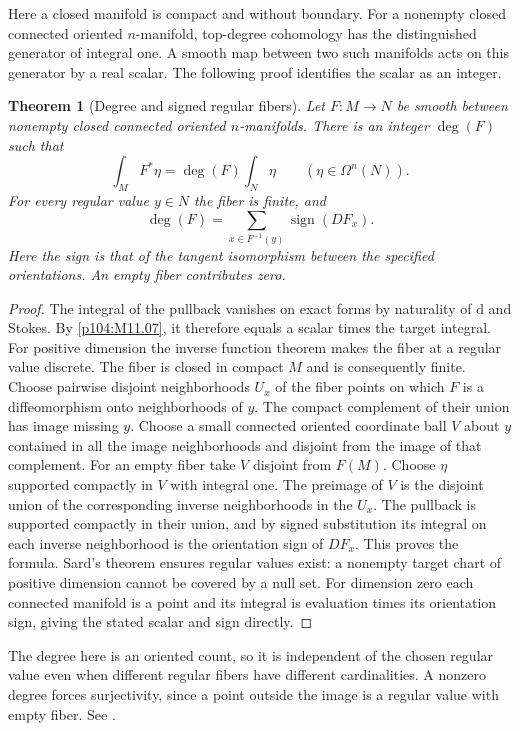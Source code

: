 \documentclass[11pt,oneside,openany]{book}
\newtheorem{theorem}{Theorem}[chapter]
\theoremstyle{definition}
\theoremstyle{remark}
\newcommand{\dd}{\mathrm d}
\begin{document}
Here a closed manifold is compact and without boundary. For a
nonempty closed connected oriented \(n\)-manifold, top-degree
cohomology has the distinguished generator of integral one. A
smooth map between two such manifolds acts on this generator
by a real scalar. The following proof identifies the scalar
as an integer.

\begin{theorem}[Degree and signed regular fibers]
\label{p104:M12.01}
Let \(F:M\to N\) be smooth between nonempty closed connected
oriented \(n\)-manifolds. There is an integer \(\deg(F)\) such that
\[
                 \int_M F^*\eta=\deg(F)\int_N\eta
                   \qquad(\eta\in\Omega^n(N)).
\]
For every regular value \(y\in N\) the fiber is finite, and
\[
       \deg(F)=\sum_{x\in F^{-1}(y)}
                     \operatorname{sign}(D F_x).
\]
Here the sign is that of the tangent isomorphism between the
specified orientations. An empty fiber contributes zero.
\end{theorem}
\begin{proof}
The integral of the pullback vanishes on exact forms by
naturality of \(\dd\) and Stokes. By \cref{p104:M11.07}, it
therefore equals a scalar times the target integral.
For positive dimension the inverse function theorem
makes the fiber at a regular value discrete. The fiber is
closed in compact \(M\) and is consequently finite. Choose
pairwise disjoint neighborhoods \(U_x\) of the fiber points
on which \(F\) is a diffeomorphism onto neighborhoods of \(y\).
The compact complement of their union has image missing
\(y\). Choose a small connected oriented coordinate ball
\(V\) about \(y\) contained in all the image neighborhoods
and disjoint from the image of that complement. For an empty
fiber take \(V\) disjoint from \(F(M)\). Choose \(\eta\) supported
compactly in \(V\) with integral one. The preimage of \(V\)
is the disjoint union of the corresponding inverse
neighborhoods in the \(U_x\). The pullback is supported
compactly in their union, and by signed substitution its
integral on each inverse neighborhood is the orientation
sign of \(D F_x\). This proves the formula. Sard's theorem
ensures regular values exist: a nonempty target chart of
positive dimension cannot be covered by a null set. For
dimension zero each connected manifold is a point and
its integral is evaluation times its orientation sign,
giving the stated scalar and sign directly.
\end{proof}
The degree here is an oriented count, so it is independent of
the chosen regular value even when different regular fibers
have different cardinalities. A nonzero degree forces
surjectivity, since a point outside the image is a regular value
with empty fiber. See \cite[Theorems 17.35--17.36]{lee}.
\end{document}
